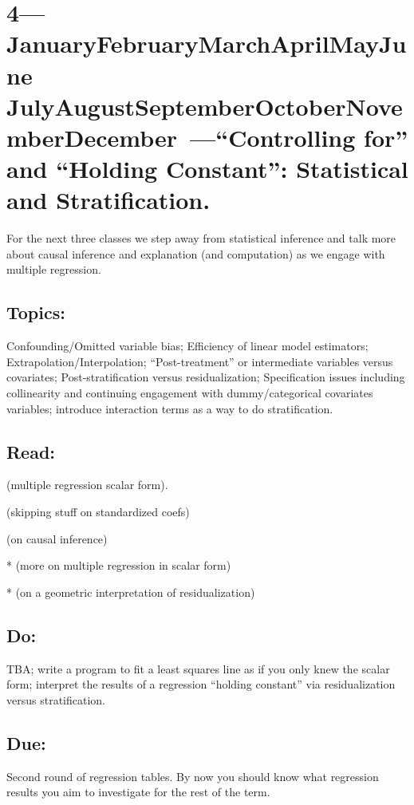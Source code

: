 \documentclass[10pt]{article}
\def\themonth{\ifcase\month\or
  January\or February\or March\or April\or May\or June\or
  July\or August\or September\or October\or November\or December\fi}
\begin{document}
\AdvanceDate[7]
\section{4---\themonth~\the\day---``Controlling for'' and ``Holding Constant'': Statistical and
  Stratification.}

For the next three classes we step away from statistical inference and
talk more about causal inference and explanation (and computation) as
we engage with multiple regression.

\subsection{Topics:} Confounding/Omitted variable bias; Efficiency of
linear model estimators; Extrapolation/Interpolation;
``Post-treatment'' or intermediate variables versus covariates;
Post-stratification versus residualization; Specification issues
including collinearity and continuing engagement with
dummy/categorical covariates variables; introduce interaction terms as
a way to do stratification.

\subsection{Read:}
\citealp[Chap 5.2]{fox2008applied} (multiple regression scalar form).

\citealp[Chap 6--7]{berk04} (skipping stuff on standardized coefs)

\citealp[Chap 9.0--9.2]{gelman2007dau} (on causal inference)

*\citealp[Chap TBA]{handj77} (more on multiple regression in scalar form)

*\citealp[Chap 8,10,11]{kaplan2009ism} (on a geometric interpretation of residualization)

\subsection{Do:} TBA; write a program to fit a least squares line as
if you only knew the scalar form; interpret the results of a
regression ``holding constant'' via residualization versus
stratification.

\subsection{Due:} Second round of regression tables. By now you should
know what regression results you aim to investigate for the rest of
the term.
\end{document}
